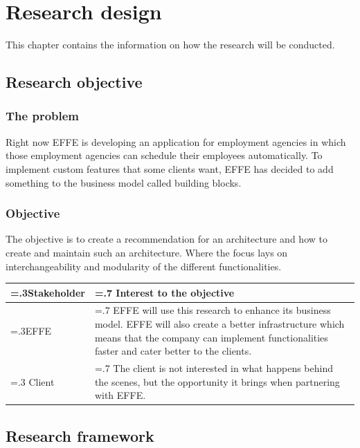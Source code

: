
\chapter{Research design}
This chapter contains the information on how the research will be conducted.

\section{Research objective}

\subsection{The problem}
\label{sec:TheProblem}

Right now EFFE is developing an application for employment agencies in which those employment agencies can schedule their employees automatically. To implement custom features that some clients want, EFFE has decided to add something to the business model called building blocks.


\subsection{Objective}
The objective is to create a recommendation for an architecture and how to create and maintain such an architecture. Where the focus lays on interchangeability and modularity of the different functionalities.

\begin{tabularx}{\linewidth}{|>{\hsize=.3\hsize}X|>{\hsize=.7\hsize}X|}
	\hline
	Stakeholder &
	Interest to the objective
	\\
	\hline
	EFFE &
	EFFE will use this research to enhance its business model. EFFE will also create a better infrastructure which means that the company can implement functionalities faster and cater better to the clients.
	\\
	\hline
	Client &
	The client is not interested in what happens behind the scenes, but the opportunity it brings when partnering with EFFE.
	\\
	\hline
\end{tabularx}

\section{Research framework}

